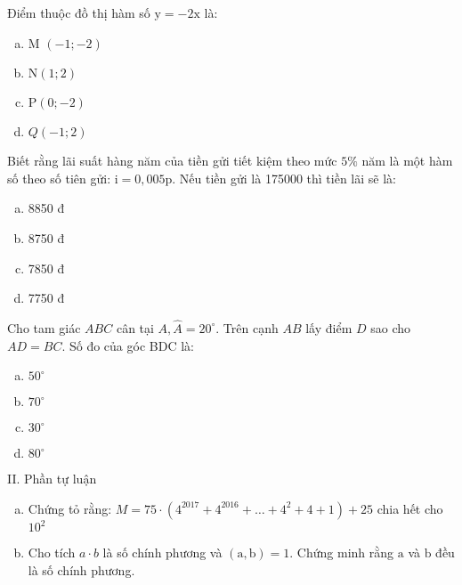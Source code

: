 \begin{bt}
	Điểm thuộc đồ thị hàm số $\mathrm{y}=-2 \mathrm{x}$ là:
	\begin{enumerate}[a.]
		\item M $(-1 ;-2)$
		\item $\mathrm{N}(1 ; 2) \quad$
		\item $\mathrm{P}(0 ;-2)$
		\item $Q(-1 ; 2)$
	\end{enumerate}
	\loigiai{} 
\end{bt}

\begin{bt}
	Biết rằng lãi suất hàng năm của tiền gửi tiết kiệm theo mức $5 \%$ năm là một hàm số theo số tiên gửi: $\mathrm{i}=0,005 \mathrm{p}$. Nếu tiền gửi là 175000 thì tiền lãi sẽ là:
	\begin{enumerate}[a.]
		\item 8850 đ
		\item 8750 đ
		\item 7850 đ
		\item 7750 đ
	\end{enumerate}
	\loigiai{} 
\end{bt}

\begin{bt}
	Cho tam giác $A B C$ cân tại $A, \hat{A}=20^{\circ}$. Trên cạnh $A B$ lấy điểm $D$ sao cho $A D=B C$. Số đo của góc BDC là:
	\begin{enumerate}[a.]
		\item $50^{\circ}$
		\item $70^{\circ}$
		\item $30^{\circ}$
		\item $80^{\circ}$
	\end{enumerate}
	\loigiai{} 
\end{bt}

II. Phần tự luận
\begin{bt}
	\hfill
	\begin{enumerate}[a.]
		\item Chứng tỏ rằng: $M=75 \cdot\left(4^{2017}+4^{2016}+\ldots+4^2+4+1\right)+25$ chia hết cho $10^2$
		\item Cho tích $a \cdot b$ là số chính phương và $(\mathrm{a}, \mathrm{b})=1$. Chứng minh rằng $\mathrm{a}$ và $\mathrm{b}$ đều là số chính phương.
	\end{enumerate}
	
	\loigiai{} 
\end{bt}


